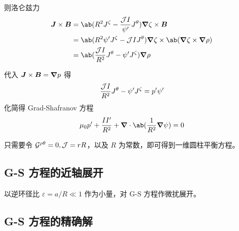 则洛仑兹力
\begin{equation}\begin{aligned}
\vec{J} \times \vec{B}
&= \ab(R^2 J^\zeta - \frac{\Jacobian I}{\psi'} J^\theta)
\grad{\zeta} \times \vec{B} \\
&= \ab(R^2 \psi' J^\zeta - \Jacobian I J^\theta)
\grad{\zeta} \times \ab(\grad{\zeta} \times \grad{\rho}) \\
&= \ab(\frac{\Jacobian I}{R^2} J^\theta - \psi' J^\zeta) \grad{\rho}
\end{aligned}\end{equation}

代入 $\bm{J} \times \bm{B} = \bm{\nabla}{p}$ 得
\begin{equation}
\frac{\mathcal{J} I}{R^2} J^\theta - \psi' J^\zeta = p' \psi'
\end{equation}
化简得 Grad-Shafranov 方程
\begin{equation}
\mu_0 p' + \frac{I I'}{R^2} + \dive{\ab( \frac{1}{R^2} \grad{\psi} )} = 0
\end{equation}

只需要令 $\mathcal{G}^{\rho\theta} = 0, \mathcal{J} = r R$，以及 $R$ 为常数，即可得到一维圆柱平衡方程。

\subsection{G-S 方程的近轴展开}

以逆环径比 $\varepsilon = a / R \ll 1$ 作为小量，对 G-S 方程作微扰展开。

\subsection{G-S 方程的精确解}
